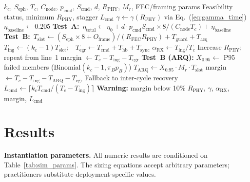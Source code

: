 \documentclass[journal]{IEEEtran}
\begin{document}
\begin{algorithm}[t]
\caption{Coordination Feasibility Test}
\label{alg:feasibility}
\begin{algorithmic}[1]
\REQUIRE $k_c$, $S_{\text{eph}}$, $T_c$, $C_{\text{node}}$, $p_{\text{cmd}}$, $S_{\text{cmd}}$, $d$, $R_{\text{PHY}}$, $M_r$, FEC/framing params
\ENSURE Feasibility status, minimum $R_{\text{PHY}}$, stagger $L_{\text{cmd}}$
\STATE $\gamma \leftarrow \gamma(R_{\text{PHY}})$ via Eq.~(\ref{eq:gamma_time})
\STATE $\eta_{\text{baseline}} \leftarrow 0.205$
\STATE \textbf{Test~A:}~$\eta_{\text{total}} \leftarrow \eta_0 + d \cdot p_{\text{cmd}} S_{\text{cmd}} \times 8 / (C_{\text{node}} T_c) + \eta_{\text{baseline}}$
\STATE \textbf{Test~B:}~$T_{\text{slot}} \leftarrow (S_{\text{eph}} \times 8 + O_{\text{frame}}) / (R_{\text{FEC}} R_{\text{PHY}}) + T_{\text{guard}} + T_{\text{acq}}$
\STATE $T_{\text{ing}} \leftarrow (k_c - 1) T_{\text{slot}}$;~~$T_{\text{egr}} \leftarrow T_{\text{cmd}} + T_{\text{hb}} + T_{\text{sync}}$
\STATE $\alpha_{\text{RX}} \leftarrow T_{\text{ing}} / T_c$
    \STATE Increase $R_{\text{PHY}}$; repeat from line~1
\ENDIF
\STATE margin $\leftarrow T_c - T_{\text{ing}} - T_{\text{egr}}$
\STATE \textbf{Test~B (ARQ):} $X_{0.95} \leftarrow$ P95 failed members (Binomial$(k_c{-}1, \pi_B p_B)$)
\STATE $T_{\text{ARQ}} \leftarrow X_{0.95} \cdot M_r \cdot T_{\text{slot}}$ 
    \STATE margin $\leftarrow T_c - T_{\text{ing}} - T_{\text{ARQ}} - T_{\text{egr}}$
    \STATE Fallback to inter-cycle recovery
\ENDIF
\STATE $L_{\text{cmd}} \leftarrow \lceil k_c T_{\text{cmd}} / (T_c - T_{\text{ing}}) \rceil$
    \STATE \textbf{Warning:} margin below 10\%
\ENDIF
\RETURN $R_{\text{PHY}}$, $\gamma$, $\alpha_{\text{RX}}$, margin, $L_{\text{cmd}}$
\end{algorithmic}
\end{algorithm}

\section{Results}

\textbf{Instantiation parameters.} All numeric results are conditioned on Table~\ref{tab:sim_params}. The sizing equations accept arbitrary parameters; practitioners substitute deployment-specific values.
\end{document}
